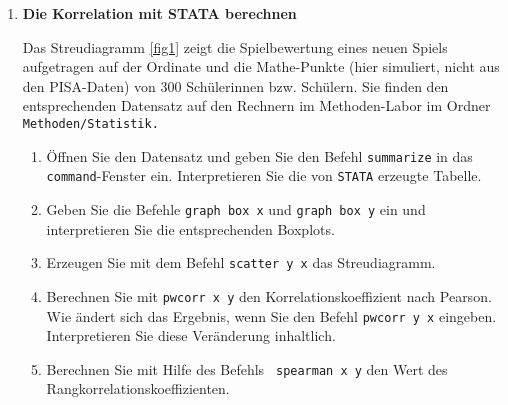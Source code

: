 \documentclass[11pt]{article}
\newcommand{\aufgabe}[1]{\item{\bf #1}}
\begin{document}
\begin{enumerate}
\newpage
\aufgabe{Die Korrelation mit STATA berechnen}


Das Streudiagramm \ref{fig1} zeigt die Spielbewertung eines neuen Spiels aufgetragen
auf der Ordinate und die Mathe-Punkte (hier simuliert, nicht aus den PISA-Daten)
von $300$ Schülerinnen bzw. Schülern. Sie finden den entsprechenden Datensatz
auf den Rechnern im Methoden-Labor im Ordner \texttt{Methoden/Statistik.}
 	\begin{enumerate}
 	\item{Öffnen Sie den Datensatz und geben Sie den Befehl \texttt{summarize} in das \texttt{command}-Fenster
 	ein. Interpretieren Sie die von \texttt{STATA} erzeugte Tabelle.}
 	\item{Geben Sie die Befehle \texttt{graph box x} und \texttt{graph box y} ein und interpretieren Sie
 	die entsprechenden Boxplots.}
 	\item{Erzeugen Sie mit dem Befehl \texttt{scatter y x} das Streudiagramm.}
 	\item{Berechnen Sie mit \texttt{pwcorr x y} den Korrelationskoeffizient nach Pearson.
 	Wie ändert sich das Ergebnis, wenn Sie den Befehl \texttt{pwcorr y x} eingeben.
 	Interpretieren Sie diese Veränderung inhaltlich.}
 	\item{Berechnen Sie mit Hilfe des Befehls \texttt{ spearman x y} den Wert des Rangkorrelationskoeffizienten.}
 	\end{enumerate}



\end{enumerate}
\end{document}
